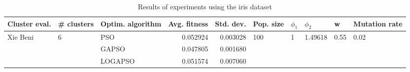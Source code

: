 \begin{table}
\centering
\caption{Results of experiments using the iris dataset}
\begin{tabular}{lllrrlllll}
\toprule
            Cluster eval. &        \# clusters & Optim. algorithm &  Avg. fitness &  Std. dev. &            Pop. size &         $\phi_{1}$ &               $\phi_{2}$ &                     w &         Mutation rate \\
\midrule
\multirow{3}{*}{Xie Beni} & \multirow{3}{*}{6} &              PSO &      0.052924 &   0.003028 & \multirow{3}{*}{100} & \multirow{3}{*}{1} & \multirow{3}{*}{1.49618} & \multirow{3}{*}{0.55} & \multirow{3}{*}{0.02} \\
                          &                    &            GAPSO &      0.047805 &   0.001680 &                      &                    &                          &                       &                       \\
                          &                    &          LOGAPSO &      0.051574 &   0.007060 &                      &                    &                          &                       &                       \\
\bottomrule
\end{tabular}
\end{table}
